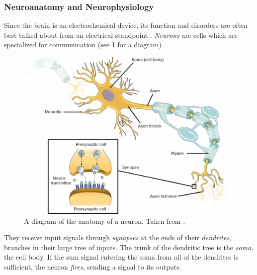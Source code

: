 \subsubsection{Neuroanatomy and Neurophysiology}
\label{sec:intro_seizures_neuroanatomy}
Since the brain is an electrochemical device, its function and disorders are often best talked about from an electrical standpoint \cite{Deco2008}.
\textit{Neurons} are cells which are specialized for communication (see \cref{fig:neuron_diagram} for a diagram).
\begin{figure}[ht]
  \centering
  \includegraphics[width=0.8\columnwidth]{figure/neuron_diagram}
  \caption[Neuron diagram]{A diagram of the anatomy of a neuron.
    Taken from \cite{Molnar2013}.
  }
  \label{fig:neuron_diagram}
\end{figure}
They receive input signals through \textit{synapses} at the ends of their \textit{dendrites}, branches in their large tree of inputs.
The trunk of the dendritic tree is the \textit{soma}, the cell body.
If the sum signal entering the soma from all of the dendrites is sufficient, the neuron \textit{fires}, sending a signal to its outputs.

